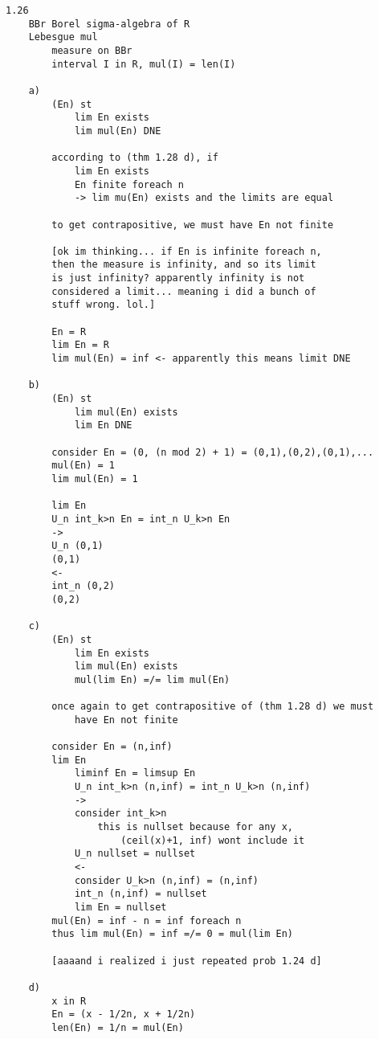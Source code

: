 \documentclass{article}
\begin{document}
\begin{flushleft}
\begin{verbatim}
1.26
    BBr Borel sigma-algebra of R 
    Lebesgue mul 
        measure on BBr 
        interval I in R, mul(I) = len(I)

    a)
        (En) st
            lim En exists  
            lim mul(En) DNE
            
        according to (thm 1.28 d), if 
            lim En exists 
            En finite foreach n 
            -> lim mu(En) exists and the limits are equal 
            
        to get contrapositive, we must have En not finite
        
        [ok im thinking... if En is infinite foreach n, 
        then the measure is infinity, and so its limit 
        is just infinity? apparently infinity is not 
        considered a limit... meaning i did a bunch of 
        stuff wrong. lol.]

        En = R 
        lim En = R 
        lim mul(En) = inf <- apparently this means limit DNE 
            
    b)
        (En) st 
            lim mul(En) exists 
            lim En DNE 

        consider En = (0, (n mod 2) + 1) = (0,1),(0,2),(0,1),...
        mul(En) = 1
        lim mul(En) = 1

        lim En 
        U_n int_k>n En = int_n U_k>n En 
        -> 
        U_n (0,1)
        (0,1)
        <- 
        int_n (0,2)
        (0,2)

    c)
        (En) st 
            lim En exists 
            lim mul(En) exists 
            mul(lim En) =/= lim mul(En)

        once again to get contrapositive of (thm 1.28 d) we must 
            have En not finite 

        consider En = (n,inf)
        lim En 
            liminf En = limsup En 
            U_n int_k>n (n,inf) = int_n U_k>n (n,inf)
            ->
            consider int_k>n
                this is nullset because for any x, 
                    (ceil(x)+1, inf) wont include it 
            U_n nullset = nullset 
            <- 
            consider U_k>n (n,inf) = (n,inf)
            int_n (n,inf) = nullset 
            lim En = nullset 
        mul(En) = inf - n = inf foreach n 
        thus lim mul(En) = inf =/= 0 = mul(lim En)

        [aaaand i realized i just repeated prob 1.24 d]

    d)
        x in R 
        En = (x - 1/2n, x + 1/2n)
        len(En) = 1/n = mul(En)


\end{verbatim}
\end{flushleft}
\end{document}
